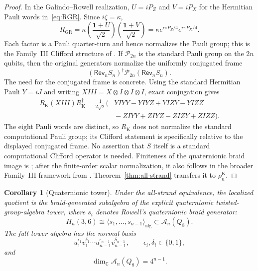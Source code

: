 \documentclass[11pt]{article}
\newtheorem{corollary}[theorem]{Corollary}
\theoremstyle{remark}
\newcommand{\Id}{\mathbf 1}
\newcommand{\bbC}{\mathbb C}
\begin{document}
\begin{proof}
In the Galindo--Rowell realization, \(U=iP_Z\) and \(V=iP_X\) for the Hermitian
Pauli words in~\eqref{eq:RGR}.  Since \(i\zeta=\kappa\),
\[
  R_{\mathrm{GR}}
  =\kappa\left(\frac{\Id+U}{\sqrt2}\right)
             \left(\frac{\Id+V}{\sqrt2}\right)
  =\kappa e^{i\pi P_Z/4}e^{i\pi P_X/4}.
\]
Each factor is a Pauli quarter-turn and hence normalizes the Pauli group; this
is the Family~III Clifford structure of
\cite[Proposition~8.1]{GalindoRowell2026}.  If \(\mathcal P_{2n}\) is the
standard Pauli group on the \(2n\) qubits, then the original generators
normalize the uniformly conjugated frame
\[
  (\mathsf{Rev}_nS_n)^\dagger\mathcal P_{2n}(\mathsf{Rev}_nS_n).
\]
The need for the conjugated frame is concrete.  Using the standard Hermitian
Pauli \(Y=iJ\) and writing \(XIII=X\otimes I\otimes I\otimes I\), exact
conjugation gives
\[
\begin{aligned}
  R_{\mathrm K}(XIII)R_{\mathrm K}^\dagger
  =\frac1{2\sqrt2}\bigl(&YIYY-YIYZ+YIZY-YIZZ\\
                         &{}-ZIYY+ZIYZ-ZIZY+ZIZZ\bigr).
\end{aligned}
\]
The eight Pauli words are distinct, so \(R_{\mathrm K}\) does not normalize the
standard computational Pauli group; its Clifford statement is specifically
relative to the displayed conjugated frame.  No assertion that \(S\) itself is
a standard computational Clifford operator is needed.  Finiteness of the
quaternionic braid image is
\cite[Theorem~3.1]{Rowell2011}; after the finite-order scalar normalization, it
also follows in the broader Family~III framework from
\cite[Theorem~8.4]{GalindoRowell2026}.  Theorem~\ref{thm:all-strand} transfers it
to \(\rho_n^{\mathrm K}\).
\end{proof}

\begin{corollary}[Quaternionic tower]\label{cor:quaternionic-tower}
Under the all-strand equivalence, the localized quotient is the
braid-generated subalgebra of the explicit quaternionic twisted-group-algebra
tower, where \(s_i\) denotes Rowell's quaternionic braid generator:
\[
  H_n(3,6)\cong
  \langle s_1,\ldots,s_{n-1}\rangle_{\mathrm{alg}}
  \subset \mathcal A_n(Q_8).
\]
The full tower algebra has the normal basis
\[
  u_1^{\epsilon_1}v_1^{\delta_1}\cdots
  u_{n-1}^{\epsilon_{n-1}}v_{n-1}^{\delta_{n-1}},
  \qquad \epsilon_i,\delta_i\in\{0,1\},
\]
and
\[
  \dim_{\bbC}\mathcal A_n(Q_8)=4^{n-1}.
\]
\end{corollary}
\end{document}
